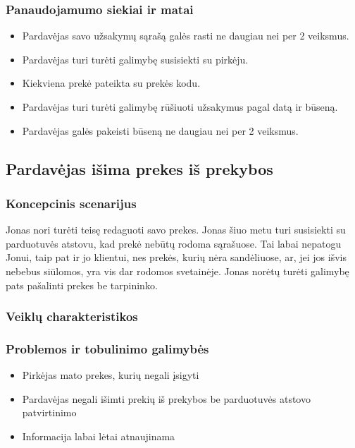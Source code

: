 \documentclass[oneside]{VUMIFPSkursinis}
\begin{document}
	\subsubsection{Panaudojamumo siekiai ir matai}
		\begin{itemize}
			\item{Pardavėjas savo užsakymų sąrašą galės rasti ne daugiau nei per 2 veiksmus.}
			\item{Pardavėjas turi turėti galimybę susisiekti su pirkėju.}
			\item{Kiekviena prekė pateikta su prekės kodu.}
			\item{Pardavėjas turi turėti galimybę rūšiuoti užsakymus pagal datą ir būseną.}
			\item{Pardavėjas galės pakeisti būseną ne daugiau nei per 2 veiksmus.}
		\end{itemize}

	\subsection{Pardavėjas išima prekes iš prekybos}
		\subsubsection{Koncepcinis scenarijus}
			Jonas nori turėti teisę redaguoti savo prekes. Jonas šiuo metu turi susisiekti su parduotuvės atstovu, kad prekė nebūtų rodoma sąrašuose. Tai labai nepatogu Jonui, taip pat ir jo klientui, nes prekės, kurių nėra sandėliuose, ar, jei jos išvis nebebus siūlomos, yra vis dar rodomos svetainėje. Jonas norėtų turėti galimybę pats pašalinti prekes be tarpininko.
		\subsubsection{Veiklų charakteristikos}

		\subsubsection{Problemos ir tobulinimo galimybės}
			\begin{itemize}
				\item{Pirkėjas mato prekes, kurių negali įsigyti}
				\item{Pardavėjas negali išimti prekių iš prekybos be parduotuvės atstovo patvirtinimo}
				\item{Informacija labai lėtai atnaujinama}
			\end{itemize}
\end{document}
